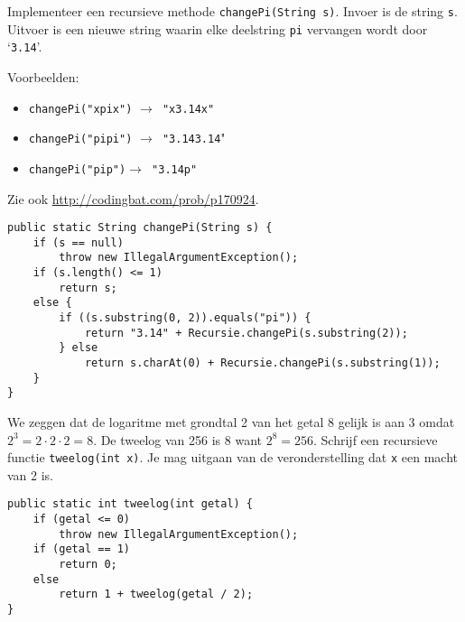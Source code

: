 \begin{oef}
\code Implementeer een recursieve methode \verb/changePi(String s)/. Invoer is de string \verb/s/. Uitvoer is een nieuwe string waarin elke deelstring \verb/pi/ vervangen wordt door `\verb/3.14/'. 

Voorbeelden:
\begin{itemize}
\item \verb/changePi("xpix")/ $\rightarrow $\verb/ "x3.14x"/
\item \verb/changePi("pipi")/ $\rightarrow $\verb/ "3.143.14/"
\item \verb/changePi("pip")/$ \rightarrow $\verb/ "3.14p"/
\end{itemize}
Zie ook \url{http://codingbat.com/prob/p170924}.
\begin{opl}
\begin{lstlisting}[caption={Vervang in een string elke pi door een 3.14}, label=recchangepi]
public static String changePi(String s) {
	if (s == null)
		throw new IllegalArgumentException();
	if (s.length() <= 1)
		return s;
	else {
		if ((s.substring(0, 2)).equals("pi")) {
			return "3.14" + Recursie.changePi(s.substring(2));
		} else
			return s.charAt(0) + Recursie.changePi(s.substring(1));
	}
}
\end{lstlisting}
\end{opl}

\end{oef}

\begin{oef}
\code We zeggen dat de logaritme met grondtal 2 van het getal 8 gelijk is aan 3 omdat $2^3 = 2\cdot 2 \cdot 2 = 8$. De tweelog van 256 is 8 want $2^8 = 256$. Schrijf een recursieve functie \verb+tweelog(int x)+. Je mag uitgaan van de veronderstelling dat \verb+x+ een macht van 2 is.
\begin{opl}
\begin{lstlisting}[caption={Tweelog van een macht van twee}, label=rectweelog]
public static int tweelog(int getal) {
	if (getal <= 0)
		throw new IllegalArgumentException();
	if (getal == 1)
		return 0;
	else
		return 1 + tweelog(getal / 2);
}
\end{lstlisting}
\end{opl}
\end{oef}



